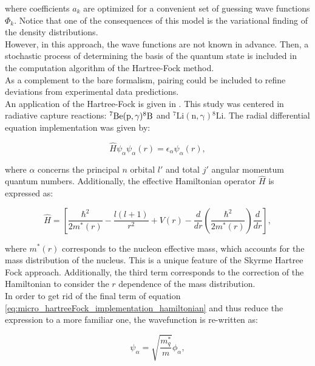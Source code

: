 \documentclass[openany]{book}
\begin{document}
where coefficients $a_k$ are optimized for a convenient set of guessing wave functions $\Phi_k$. Notice that one of the consequences of this model is the variational finding of the density distributions.   \\


However, in this approach, the wave functions are not known in advance. Then, a stochastic process of determining the basis of the quantum state is included in the computation algorithm of the Hartree-Fock method. \\

As a complement to the bare formalism, pairing could be included to refine deviations from experimental data predictions. \\

An application of the Hartree-Fock is given in \cite{leanh_minhloc_2022}. This study was centered in radiative capture reactions: $\mathrm{{}^{7}Be(p, \gamma){}^{8}B}$ and $\mathrm{{}^{7}Li(n, \gamma){}^{8}Li}$. The radial differential equation implementation was given by: 

\begin{equation}\label{eq:micro_hartreeFock_implementation_schrodinger}
	\hat H \psi_{\alpha} \psi_{\alpha}(r) = \epsilon_\alpha \psi_{\alpha} (r), 
\end{equation}

where $\alpha$ concerns the principal $n$ orbital $l'$ and total $j'$ angular momentum quantum numbers. Additionally, the effective Hamiltonian operator $\hat H$ is expressed as: 

\begin{equation}\label{eq:micro_hartreeFock_implementation_hamiltonian}
	\hat H =  \left[\frac{\hbar^2}{2m^{*}(r)} - \frac{l(l+1)}{r^2}  + V(r) - \frac{d}{dr} \left (\frac{\hbar^2}{2m^*(r)} \right) \frac{d}{dr} \right] , 
\end{equation}

where $m^{*}(r)$ corresponds to the nucleon effective mass, which accounts for the mass distribution of the nucleus. This is a unique feature of the Skyrme Hartree Fock approach.  Additionally, the third term corresponds to the correction of the Hamiltonian to consider the $r$ dependence of the mass distribution. \\

In order to get rid of the final term of equation \ref{eq:micro_hartreeFock_implementation_hamiltonian} and thus reduce the expression to a more familiar one, the wavefunction is re-written as: 

\begin{equation}\label{eq:micro_hartreeFock_implementation_wavefunction_alternative}
	\psi_\alpha = \sqrt{\frac{m^{*}_q}{m}} \phi_\alpha,
\end{equation}
\end{document}

